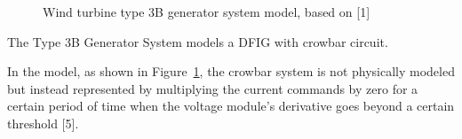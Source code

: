 \documentclass[
  a4paper,
  DIV=11,
  numbers=noendperiod]{scrartcl}
\begin{document}
\begin{figure}


\caption{\label{fig-generatorType3b}Wind turbine type 3B generator
system model, based on {[}1{]}}

\end{figure}%

The Type 3B Generator System models a DFIG with crowbar circuit.

In the model, as shown in Figure~\ref{fig-generatorType3b}, the crowbar
system is not physically modeled but instead represented by multiplying
the current commands by zero for a certain period of time when the
voltage module's derivative goes beyond a certain threshold {[}5{]}.
\end{document}
